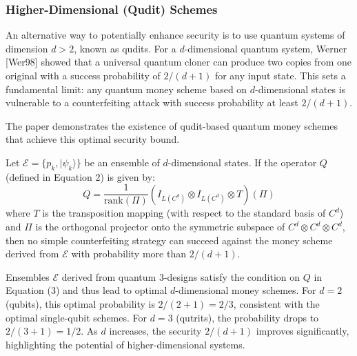 \documentclass{article} %
\begin{document}



\subsubsection{Higher-Dimensional (Qudit) Schemes}

An alternative way to potentially enhance security is to use quantum systems of dimension $d > 2$, known as qudits. For a $d$-dimensional quantum system, Werner [Wer98] showed that a universal quantum cloner can produce two copies from one original with a success probability of $2/(d+1)$ for any input state. This sets a fundamental limit: any quantum money scheme based on $d$-dimensional states is vulnerable to a counterfeiting attack with success probability at least $2/(d+1)$.

The paper demonstrates the existence of qudit-based quantum money schemes that achieve this optimal security bound.

\begin{tcolorbox}[
    skin=freelance,
    title={Proposition 4 (Molina, Vidick, Watrous, 2012)}
]

Let $\mathcal{E} = \{p_k, |\psi_k\rangle\}$ be an ensemble of $d$-dimensional states. If the operator $Q$ (defined in Equation 2) is given by:
$$ Q = \frac{1}{\text{rank}(\Pi)} (I_{L(C^d)} \otimes I_{L(C^d)} \otimes T) (\Pi)$$
where $T$ is the transposition mapping (with respect to the standard basis of $C^d$) and $\Pi$ is the orthogonal projector onto the symmetric subspace of $C^d \otimes C^d \otimes C^d$, then no simple counterfeiting strategy can succeed against the money scheme derived from $\mathcal{E}$ with probability more than $2/(d+1)$.

\end{tcolorbox}
\newpage

Ensembles $\mathcal{E}$ derived from quantum 3-designs satisfy the condition on $Q$ in Equation (3) and thus lead to optimal $d$-dimensional money schemes.
For $d=2$ (qubits), this optimal probability is $2/(2+1) = 2/3$, consistent with the optimal single-qubit schemes. For $d=3$ (qutrits), the probability drops to $2/(3+1) = 1/2$. As $d$ increases, the security $2/(d+1)$ improves significantly, highlighting the potential of higher-dimensional systems.
\end{document}
